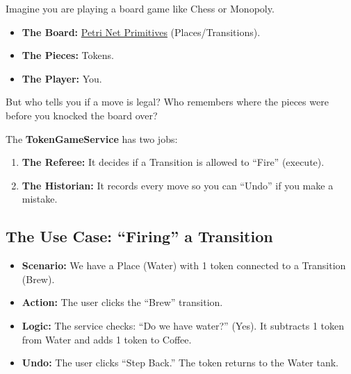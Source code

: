 \documentclass[a4paper,11pt,oneside]{report}
\begin{document}
Imagine you are playing a board game like Chess or Monopoly.
\begin{itemize}
    \item \textbf{The Board:} \hyperref[chap:primitives]{Petri Net Primitives} (Places/Transitions).
    \item \textbf{The Pieces:} Tokens.
    \item \textbf{The Player:} You.
\end{itemize}

But who tells you if a move is legal? Who remembers where the pieces were before you knocked the board over?

The \textbf{TokenGameService} has two jobs:
\begin{enumerate}
    \item \textbf{The Referee:} It decides if a Transition is allowed to ``Fire'' (execute).
    \item \textbf{The Historian:} It records every move so you can ``Undo'' if you make a mistake.
\end{enumerate}

\subsection{The Use Case: ``Firing'' a Transition}

\begin{itemize}
    \item \textbf{Scenario:} We have a Place (Water) with 1 token connected to a Transition (Brew).
    \item \textbf{Action:} The user clicks the ``Brew'' transition.
    \item \textbf{Logic:} The service checks: ``Do we have water?'' (Yes). It subtracts 1 token from Water and adds 1 token to Coffee.
    \item \textbf{Undo:} The user clicks ``Step Back.'' The token returns to the Water tank.
\end{itemize}
\end{document}
